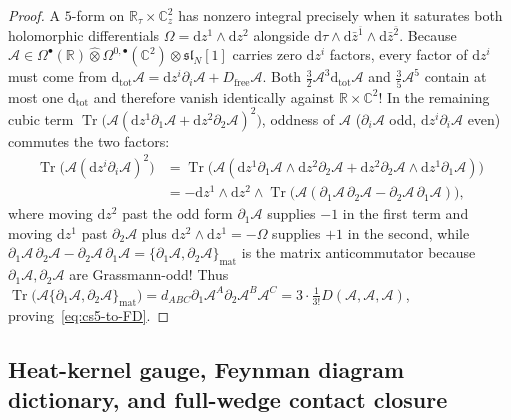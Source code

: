 \documentclass[11pt,letterpaper]{article}
\numberwithin{equation}{section}
\theoremstyle{plain}
\theoremstyle{definition}
\theoremstyle{remark}
\newcommand{\dd}{\mathrm{d}}
\newcommand{\fsl}{\mathfrak{sl}}
\newcommand{\Tr}{\operatorname{Tr}}
\begin{document}
\begin{proof}
A $5$-form on $\mathbb{R}_\tau\times\mathbb{C}^2_z$ has nonzero integral precisely when it saturates both holomorphic differentials $\Omega = \dd z^1\wedge\dd z^2$ alongside $\dd\tau\wedge\dd\bar{z}^{\bar{1}}\wedge\dd\bar{z}^{\bar{2}}$. Because $\mathcal{A} \in \Omega^\bullet(\mathbb{R})\widehat{\otimes}\Omega^{0,\bullet}(\mathbb{C}^2)\otimes\fsl_N[1]$ carries zero $\dd z^i$ factors, every factor of $\dd z^i$ must come from $\dd_{\mathrm{tot}}\mathcal{A} = \dd z^i\partial_i\mathcal{A} + D_{\mathrm{free}}\mathcal{A}$. Both $\frac{3}{2}\mathcal{A}^3\dd_{\mathrm{tot}}\mathcal{A}$ and $\frac{3}{5}\mathcal{A}^5$ contain at most one $\dd_{\mathrm{tot}}$ and therefore vanish identically against $\mathbb{R}\times\mathbb{C}^2$! In the remaining cubic term $\Tr\big(\mathcal{A}(\dd z^1\partial_1\mathcal{A} + \dd z^2\partial_2\mathcal{A})^2\big)$, oddness of $\mathcal{A}$ ($\partial_i\mathcal{A}$ odd, $\dd z^i\partial_i\mathcal{A}$ even) commutes the two factors:
\begin{align*}
\Tr\!\big(\mathcal{A}(\dd z^i\partial_i\mathcal{A})^2\big)
&= \Tr\!\big(\mathcal{A}(\dd z^1\partial_1\mathcal{A}\wedge\dd z^2\partial_2\mathcal{A} + \dd z^2\partial_2\mathcal{A}\wedge\dd z^1\partial_1\mathcal{A})\big) \\
&= -\dd z^1\wedge\dd z^2\wedge\Tr\!\big(\mathcal{A}(\partial_1\mathcal{A}\,\partial_2\mathcal{A} - \partial_2\mathcal{A}\,\partial_1\mathcal{A})\big),
\end{align*}
where moving $\dd z^2$ past the odd form $\partial_1\mathcal{A}$ supplies $-1$ in the first term and moving $\dd z^1$ past $\partial_2\mathcal{A}$ plus $\dd z^2\wedge\dd z^1 = -\Omega$ supplies $+1$ in the second, while $\partial_1\mathcal{A}\,\partial_2\mathcal{A} - \partial_2\mathcal{A}\,\partial_1\mathcal{A} = \{\partial_1\mathcal{A}, \partial_2\mathcal{A}\}_{\mathrm{mat}}$ is the matrix anticommutator because $\partial_1\mathcal{A}, \partial_2\mathcal{A}$ are Grassmann-odd! Thus $\Tr\big(\mathcal{A}\{\partial_1\mathcal{A},\partial_2\mathcal{A}\}_{\mathrm{mat}}\big) = d_{ABC}\partial_1\mathcal{A}^A\partial_2\mathcal{A}^B\mathcal{A}^C = 3\cdot\frac{1}{3!}D(\mathcal{A},\mathcal{A},\mathcal{A})$, proving~\eqref{eq:cs5-to-FD}.
\end{proof}

\subsection{Heat-kernel gauge, Feynman diagram dictionary, and full-wedge contact closure}
\label{subsec:heat-feynman-rules}
\end{document}
